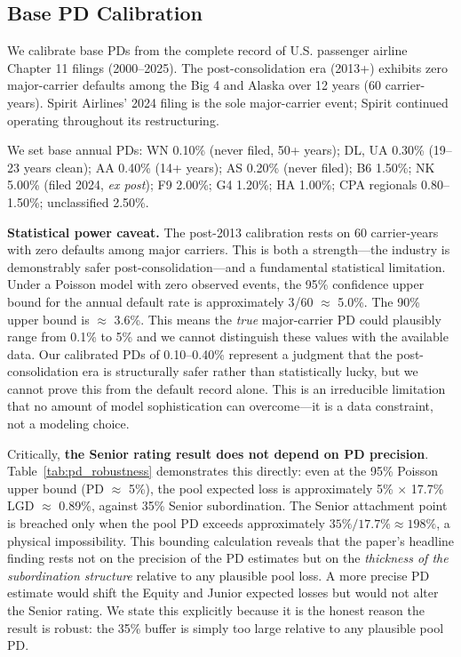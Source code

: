 \documentclass[12pt,a4paper]{article}
\begin{document}
\subsection{Base PD Calibration}

We calibrate base PDs from the complete record of U.S. passenger airline Chapter 11 filings (2000--2025). The post-consolidation era (2013+) exhibits zero major-carrier defaults among the Big 4 and Alaska over 12 years (60 carrier-years). Spirit Airlines' 2024 filing is the sole major-carrier event; Spirit continued operating throughout its restructuring.

We set base annual PDs: WN 0.10\% (never filed, 50+ years); DL, UA 0.30\% (19--23 years clean); AA 0.40\% (14+ years); AS 0.20\% (never filed); B6 1.50\%; NK 5.00\% (filed 2024, \textit{ex post}); F9 2.00\%; G4 1.20\%; HA 1.00\%; CPA regionals 0.80--1.50\%; unclassified 2.50\%.

\textbf{Statistical power caveat.} The post-2013 calibration rests on 60 carrier-years with zero defaults among major carriers. This is both a strength---the industry is demonstrably safer post-consolidation---and a fundamental statistical limitation. Under a Poisson model with zero observed events, the 95\% confidence upper bound for the annual default rate is approximately 3/60 $\approx$ 5.0\%. The 90\% upper bound is $\approx$ 3.6\%. This means the \textit{true} major-carrier PD could plausibly range from 0.1\% to 5\% and we cannot distinguish these values with the available data. Our calibrated PDs of 0.10--0.40\% represent a judgment that the post-consolidation era is structurally safer rather than statistically lucky, but we cannot prove this from the default record alone. This is an irreducible limitation that no amount of model sophistication can overcome---it is a data constraint, not a modeling choice.

Critically, \textbf{the Senior rating result does not depend on PD precision}. Table~\ref{tab:pd_robustness} demonstrates this directly: even at the 95\% Poisson upper bound (PD $\approx$ 5\%), the pool expected loss is approximately 5\% $\times$ 17.7\% LGD $\approx$ 0.89\%, against 35\% Senior subordination. The Senior attachment point is breached only when the pool PD exceeds approximately $35\% / 17.7\% \approx 198\%$, a physical impossibility. This bounding calculation reveals that the paper's headline finding rests not on the precision of the PD estimates but on the \textit{thickness of the subordination structure} relative to any plausible pool loss. A more precise PD estimate would shift the Equity and Junior expected losses but would not alter the Senior rating. We state this explicitly because it is the honest reason the result is robust: the 35\% buffer is simply too large relative to any plausible pool PD.
\end{document}
